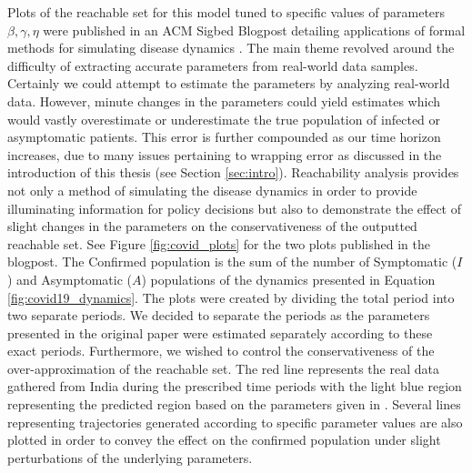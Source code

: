 Plots of the reachable set for this model tuned to specific values of parameters $\beta, \gamma, \eta$ were published in an ACM Sigbed Blogpost detailing applications of formal methods for simulating disease dynamics \cite{bak2021covid}.
%
The main theme revolved around the difficulty of extracting accurate parameters from real-world data samples.
%
Certainly we could attempt to estimate the parameters by analyzing real-world data. However, minute changes in the parameters could yield estimates which would vastly overestimate or underestimate the true population of infected or asymptomatic patients.
%
This error is further compounded as our time horizon increases, due to many issues pertaining to wrapping error as discussed in the introduction of this thesis (see Section \ref{sec:intro}).
%
Reachability analysis provides not only a method of simulating the disease dynamics in order to provide illuminating information for policy decisions but also to demonstrate the effect of slight changes in the parameters on the conservativeness of the outputted reachable set.
%
See Figure \ref{fig:covid_plots} for the two plots published in the blogpost. The Confirmed population is the sum of the number of Symptomatic ($I$) and Asymptomatic ($A$) populations of the dynamics presented in Equation \ref{fig:covid19_dynamics}. The plots were created by dividing the total period into two separate periods.
%
We decided to separate the periods as the parameters presented in the original paper \cite{ansumali2020modelling} were estimated separately according to these exact periods. Furthermore, we wished to control the conservativeness of the over-approximation of the reachable set.
%
The red line represents the real data gathered from India during the prescribed time periods with the light blue region representing the predicted region based on the parameters given in \cite{ansumali2020modelling}.
%
Several lines representing trajectories generated according to specific parameter values are also plotted in order to convey the effect on the confirmed population under slight perturbations of the underlying parameters.

